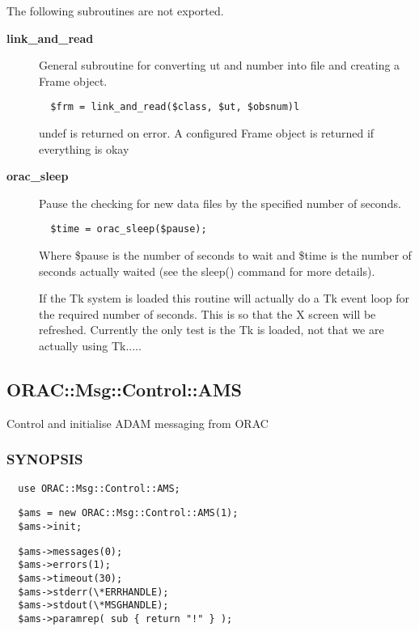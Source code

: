 The following subroutines are not exported.

\begin{description}
\item[\textbf{link\_and\_read}] \mbox{}

General subroutine for converting ut and number into file
and creating a Frame object.

\begin{verbatim}
  $frm = link_and_read($class, $ut, $obsnum)l
\end{verbatim}


undef is returned on error.
A configured Frame object is returned if everything is okay

\item[\textbf{orac\_sleep}] \mbox{}

Pause the checking for new data files by the specified number of seconds.

\begin{verbatim}
  $time = orac_sleep($pause);
\end{verbatim}


Where \$pause is the number of seconds to wait and \$time is the number
of seconds actually waited (see the sleep() command for more details).



If the Tk system is loaded this routine will actually do a Tk event loop
for the required number of seconds. This is so that the X screen will
be refreshed. Currently the only test is the Tk is loaded, not that
we are actually using Tk.....

\end{description}


\subsection{ORAC::Msg::Control::AMS\label{ORAC::Msg::Control::AMS}}

Control and initialise ADAM messaging from ORAC

\subsubsection*{SYNOPSIS\label{ORAC::Msg::Control::AMS_SYNOPSIS}}\begin{verbatim}
  use ORAC::Msg::Control::AMS;
\end{verbatim}
\begin{verbatim}
  $ams = new ORAC::Msg::Control::AMS(1);
  $ams->init;
\end{verbatim}
\begin{verbatim}
  $ams->messages(0);
  $ams->errors(1);
  $ams->timeout(30);
  $ams->stderr(\*ERRHANDLE);
  $ams->stdout(\*MSGHANDLE);
  $ams->paramrep( sub { return "!" } );
\end{verbatim}
